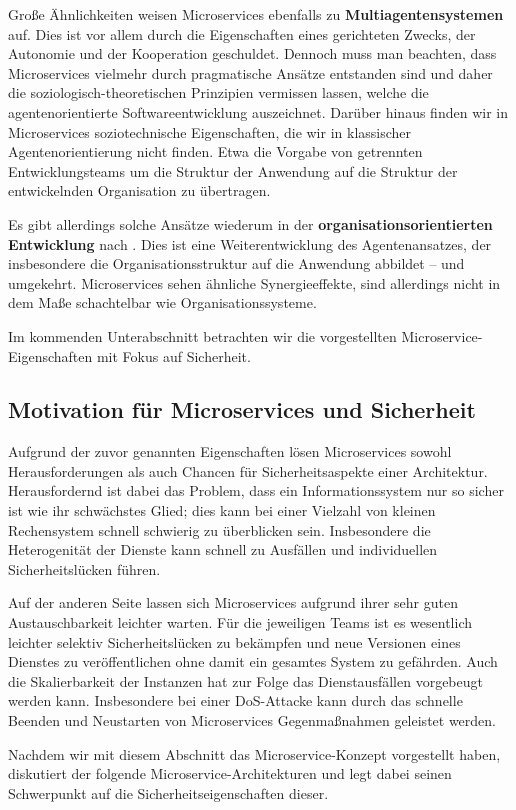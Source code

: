 Große Ähnlichkeiten weisen Microservices ebenfalls zu \textbf{Multiagentensystemen} auf. Dies ist vor allem durch die Eigenschaften eines gerichteten Zwecks, der Autonomie und der Kooperation geschuldet. Dennoch muss man beachten, dass Microservices vielmehr durch pragmatische Ansätze entstanden sind und daher die soziologisch-theoretischen Prinzipien vermissen lassen, welche die agentenorientierte Softwareentwicklung auszeichnet. Darüber hinaus finden wir in Microservices soziotechnische Eigenschaften, die wir in klassischer Agentenorientierung nicht finden. Etwa die Vorgabe von getrennten Entwicklungsteams um die Struktur der Anwendung auf die Struktur der entwickelnden Organisation zu übertragen. 

Es gibt allerdings solche Ansätze wiederum in der \textbf{organisationsorientierten Entwicklung} nach \cite{Wester-Ebbinghaus10}. Dies ist eine Weiterentwicklung des Agentenansatzes, der insbesondere die Organisationsstruktur auf die Anwendung abbildet – und umgekehrt. Microservices sehen ähnliche Synergieeffekte, sind allerdings nicht in dem Maße schachtelbar wie Organisationssysteme.

Im kommenden Unterabschnitt betrachten wir die vorgestellten Microservice-Eigenschaften mit Fokus auf Sicherheit.

\subsection{Motivation für Microservices und Sicherheit}
\label{subsec:motivation}

Aufgrund der zuvor genannten Eigenschaften lösen Microservices sowohl Herausforderungen als auch Chancen für Sicherheitsaspekte einer Architektur. Herausfordernd ist dabei das Problem, dass ein Informationssystem nur so sicher ist wie ihr schwächstes Glied; dies kann bei einer Vielzahl von kleinen Rechensystem schnell schwierig zu überblicken sein. Insbesondere die Heterogenität der Dienste kann schnell zu Ausfällen und individuellen Sicherheitslücken führen.

Auf der anderen Seite lassen sich Microservices aufgrund ihrer sehr guten Austauschbarkeit leichter warten. Für die jeweiligen Teams ist es wesentlich leichter selektiv Sicherheitslücken zu bekämpfen und neue Versionen eines Dienstes zu veröffentlichen ohne damit ein gesamtes System zu gefährden. Auch die Skalierbarkeit der Instanzen hat zur Folge das Dienstausfällen vorgebeugt werden kann. Insbesondere bei einer DoS-Attacke kann durch das schnelle Beenden und Neustarten von Microservices Gegenmaßnahmen geleistet werden.

Nachdem wir mit diesem Abschnitt das Microservice-Konzept vorgestellt haben, diskutiert der folgende Microservice-Architekturen und legt dabei seinen Schwerpunkt auf die Sicherheitseigenschaften dieser.